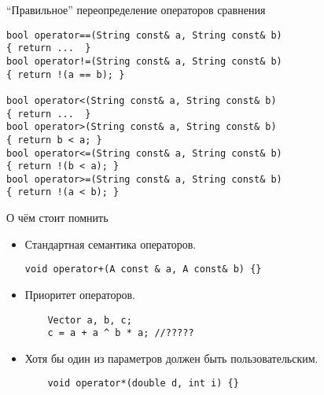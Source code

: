 \documentclass{beamer}
\begin{document}
\begin{frame}[fragile]{``Правильное'' переопределение операторов сравнения}
    \begin{lstlisting}[basicstyle=\fontsize{9pt}{1em}\ttfamily]
bool operator==(String const& a, String const& b) 
{ return ...  }
bool operator!=(String const& a, String const& b) 
{ return !(a == b); }

bool operator<(String const& a, String const& b) 
{ return ...  }
bool operator>(String const& a, String const& b) 
{ return b < a; }
bool operator<=(String const& a, String const& b) 
{ return !(b < a); }
bool operator>=(String const& a, String const& b) 
{ return !(a < b); }
    \end{lstlisting}
\end{frame}

\begin{frame}[fragile]{О чём стоит помнить}
    \begin{itemize}
        \item Стандартная семантика операторов.
\begin{lstlisting}
void operator+(A const & a, A const& b) {}
\end{lstlisting}
        \item Приоритет операторов.
\begin{lstlisting}
    Vector a, b, c;
    c = a + a ^ b * a; //?????
\end{lstlisting}
    \item Хотя бы один из параметров должен быть пользовательским.
\begin{lstlisting}
    void operator*(double d, int i) {}
\end{lstlisting}
    \end{itemize}
\end{frame}
\end{document}
